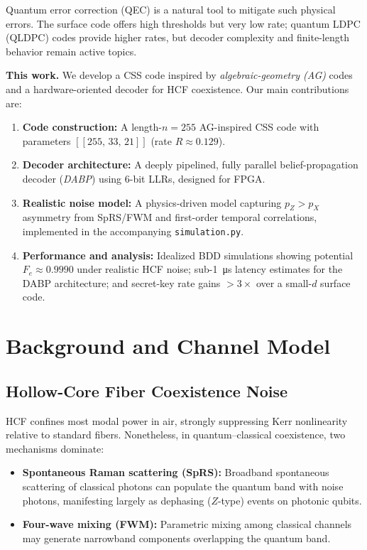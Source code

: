 \documentclass[conference]{IEEEtran}
\begin{document}
Quantum error correction (QEC) is a natural tool to mitigate such physical errors. The surface code offers high thresholds but very low rate; quantum LDPC (QLDPC) codes provide higher rates, but decoder complexity and finite-length behavior remain active topics.

\textbf{This work.} We develop a CSS code inspired by \emph{algebraic-geometry (AG)} codes and a hardware-oriented decoder for HCF coexistence. Our main contributions are:
\begin{enumerate}[leftmargin=*,itemsep=1pt,topsep=2pt]
  \item \textbf{Code construction:} A length-\(n=255\) AG-inspired CSS code with parameters \( [[255,\,33,\,21]] \) (rate \(R\approx0.129\)).
  \item \textbf{Decoder architecture:} A deeply pipelined, fully parallel belief-propagation decoder (\emph{DABP}) using 6-bit LLRs, designed for FPGA.
  \item \textbf{Realistic noise model:} A physics-driven model capturing \(p_Z\!>\!p_X\) asymmetry from SpRS/FWM and first-order temporal correlations, implemented in the accompanying \texttt{simulation.py}.
  \item \textbf{Performance and analysis:} Idealized BDD simulations showing potential \(F_e\approx0.9990\) under realistic HCF noise; sub-\SI{1}{\micro\second} latency estimates for the DABP architecture; and secret-key rate gains \(>\!3\times\) over a small-\(d\) surface code.
\end{enumerate}

\section{Background and Channel Model}\label{sec:background}

\subsection{Hollow-Core Fiber Coexistence Noise}
HCF confines most modal power in air, strongly suppressing Kerr nonlinearity relative to standard fibers. Nonetheless, in quantum--classical coexistence, two mechanisms dominate:
\begin{itemize}[leftmargin=*,itemsep=1pt]
  \item \textbf{Spontaneous Raman scattering (SpRS):} Broadband spontaneous scattering of classical photons can populate the quantum band with noise photons, manifesting largely as dephasing (\(Z\)-type) events on photonic qubits.
  \item \textbf{Four-wave mixing (FWM):} Parametric mixing among classical channels may generate narrowband components overlapping the quantum band.
\end{itemize}
\end{document}
